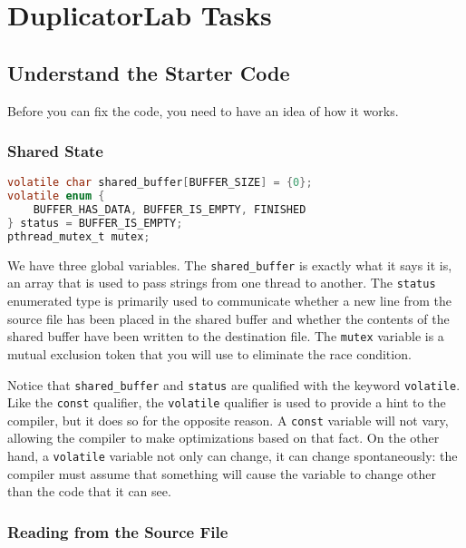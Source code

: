     \section{DuplicatorLab Tasks}

    \subsection{Understand the Starter Code}

    Before you can fix the code, you need to have an idea of how it works.

    \subsubsection{Shared State}

%    
\begin{lstlisting}[language=c, numbers=none]
volatile char shared_buffer[BUFFER_SIZE] = {0};
volatile enum {
    BUFFER_HAS_DATA, BUFFER_IS_EMPTY, FINISHED
} status = BUFFER_IS_EMPTY;
pthread_mutex_t mutex;
\end{lstlisting}

    We have three global variables.
    The \lstinline{shared_buffer} is exactly what it says it is, an array that is used to pass strings from one thread to another.
    The \lstinline{status} enumerated type is primarily used to communicate whether a new line from the source file has been placed in the shared buffer and whether the contents of the shared buffer have been written to the destination file.
    The \lstinline{mutex} variable is a mutual exclusion token that you will use to eliminate the race condition.

    Notice that \lstinline{shared_buffer} and \lstinline{status} are qualified with the keyword \lstinline{volatile}.
    Like the \lstinline{const} qualifier, the \lstinline{volatile} qualifier is used to provide a hint to the compiler, but it does so for the opposite reason.
    A \lstinline{const} variable will not vary, allowing the compiler to make optimizations based on that fact.
    On the other hand, a \lstinline{volatile} variable not only can change, it can change spontaneously: the compiler must assume that something will cause the variable to change other than the code that it can see.

    \subsubsection{Reading from the Source File}\label{subsubsec:understandReader}

